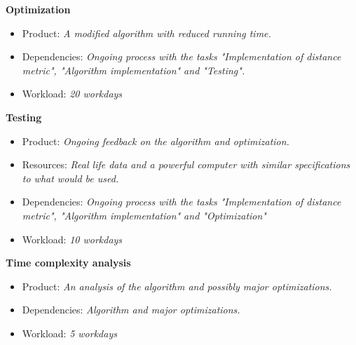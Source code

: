\documentclass[12pt,a4paper]{article}
\begin{document}
\noindent
\textbf{Optimization}
\begin{itemize}
  \item Product: \textit{A modified algorithm with reduced running time.}
  \item Dependencies: \textit{Ongoing process with the tasks "Implementation of
    distance metric", "Algorithm implementation" and "Testing".}
  \item Workload: \textit{20 workdays}
\end{itemize}

\noindent
\textbf{Testing}
\begin{itemize}
  \item Product: \textit{Ongoing feedback on the algorithm and optimization.}
  \item Resources: \textit{Real life data and a powerful computer with similar
    specifications to what would be used.}
  \item Dependencies: \textit{Ongoing process with the tasks "Implementation of
    distance metric", "Algorithm implementation" and "Optimization"}
  \item Workload: \textit{10 workdays}
\end{itemize}

\noindent
\textbf{Time complexity analysis}
\begin{itemize}
  \item Product: \textit{An analysis of the algorithm and possibly major
    optimizations.}
  \item Dependencies: \textit{Algorithm and major optimizations.}
  \item Workload: \textit{5 workdays}
\end{itemize}


\begin{gantt}[xunitlength=0.5cm,fontsize=\small,titlefontsize=\small]{10}{20}
  \begin{ganttitle}
  \end{ganttitle}
\end{gantt}
\end{document}
